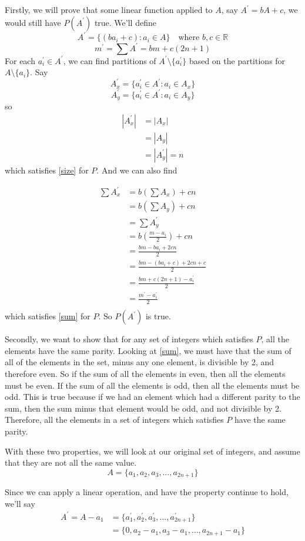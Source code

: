 \documentclass[12pt]{article}
\newcommand{\R}{\mathbb{R}}
\newcommand{\p}{^{\prime}}
\begin{document}
Firstly, we will prove that some linear function applied to $A$, say $A\p=bA+c$, we would still have $P(A\p)$ true. We'll define
\[A\p = \{(ba_i +c) : a_i\in A\} \quad \text{where $b,c\in\R$}\]
\[m\p = \sum A\p = bm + c(2n+1)\]
For each $a_i\p \in A\p$, we can find partitions of $A\p\setminus\{a_i\p\}$ based on the partitions for $A\setminus\{a_i\}$. Say
\[A_x\p = \{a_i\p\in A\p: a_i\in A_x\}\]
\[A_y\p = \{a_i\p\in A\p: a_i\in A_y\}\]
so
\begin{align*}
    |A_x\p| &= |A_x| \\
    & = |A_y| \\
    & = |A_y\p| = n
\end{align*}
which satisfies \eqref{size} for $P$. And we can also find

\begin{align*}
    \sum A_x\p &= b\left(\sum A_x\right) + cn \\
    & = b\left(\sum A_y\right) + cn \\
    & = \sum A_y\p \\
    & = b\left(\frac{m - a_i}{2}\right) + cn \\
    & = \frac{bm - ba_i + 2cn}{2} \\
    & = \frac{bm - (ba_i+c) + 2cn + c}{2} \\
    & = \frac{bm + c(2n+1) - a_i\p}{2} \\
    & = \frac{m\p - a_i\p}{2} \\
\end{align*}
which satisfies \eqref{sum} for $P$. So $P(A\p)$ is true.

Secondly, we want to show that for any set of integers which satisfies $P$, all the elements have the same parity. Looking at \eqref{sum}, we must have that the sum of all of the elements in the set, minus any one element, is divisible by 2, and therefore even. So if the sum of all the elements in even, then all the elements must be even. If the sum of all the elements is odd, then all the elements must be odd. This is true because if we had an element which had a different parity to the sum, then the sum minus that element would be odd, and not divisible by 2. Therefore, all the elements in a set of integers which satisfies $P$ have the same parity.

With these two properties, we will look at our original set of integers, and assume that they are not all the same value.
\[A = \{a_1, a_2, a_3, \dots, a_{2n+1}\}\]

Since we can apply a linear operation, and have the property continue to hold, we'll say
\begin{align*}
    A\p = A-a_1 &= \{a_1\p, a_2\p, a_3\p, \dots, a_{2n+1}\p\} \\
                &= \{0, a_2-a_1, a_3-a_1, \dots, a_{2n+1}-a_1\}
\end{align*}
\end{document}
